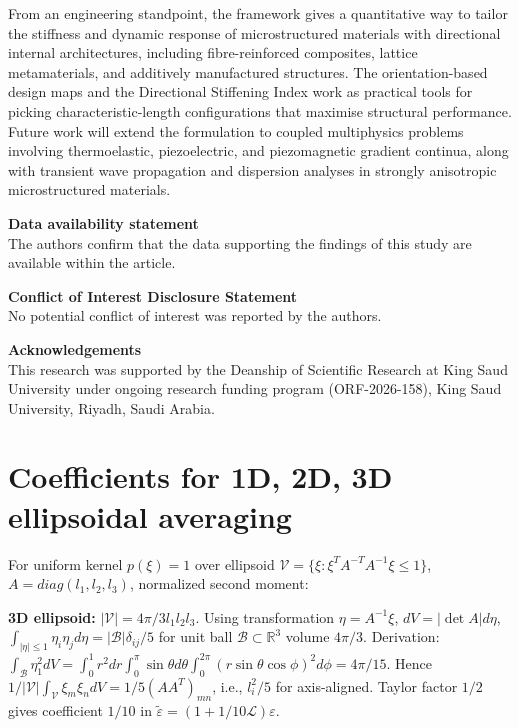 \documentclass[final,3p,times,fleqn]{elsarticle}
\newcommand{\rev}[1]{\textcolor{revcolor}{#1}}
\begin{document}
From an engineering standpoint, the framework gives a quantitative way
to tailor the stiffness and dynamic response of microstructured
materials with directional internal architectures, including
fibre-reinforced composites, lattice metamaterials, and additively
manufactured structures. The orientation-based design maps and the
Directional Stiffening Index work as practical tools for picking
characteristic-length configurations that maximise structural
performance. Future work will extend the formulation to coupled
multiphysics problems involving thermoelastic, piezoelectric, and
piezomagnetic gradient continua, along with transient wave propagation
and dispersion analyses in strongly anisotropic microstructured
materials.

\vspace{.4cm}
\noindent\textbf{\large{Data availability statement}}\\
The authors confirm that the data supporting the findings of this study
are available within the article.
\vspace{.4cm}

\noindent\textbf{\large{Conflict of Interest Disclosure Statement}}\\
No potential conflict of interest was reported by the authors.
\vspace{.4cm}

\noindent\textbf{\large{Acknowledgements}}\\
This research was supported by the Deanship of Scientific Research at King Saud University under ongoing research funding program (ORF-2026-158), King Saud University, Riyadh, Saudi Arabia.


\appendix
\section{Coefficients for 1D, 2D, 3D ellipsoidal averaging}
\label{app:coeffs}
\rev{For uniform kernel $p(\xi)=1$ over ellipsoid $\mathcal{V}=\{\xi: \xi^T A^{-T}A^{-1}\xi\le1\}$, $A=diag(l_1,l_2,l_3)$, normalized second moment:}

\rev{\textbf{3D ellipsoid:} $|\mathcal{V}|=4\pi/3 l_1l_2l_3$. Using transformation $\eta=A^{-1}\xi$, $dV=|\det A|d\eta$, $\int_{|\eta|\le1}\eta_i\eta_j d\eta = |\mathcal{B}|\delta_{ij}/5$ for unit ball $\mathcal{B}\subset\mathbb{R}^3$ volume $4\pi/3$. Derivation: $\int_{\mathcal{B}} \eta_1^2 dV = \int_0^1 r^2 dr \int_0^\pi \sin\theta d\theta \int_0^{2\pi} (r\sin\theta\cos\phi)^2 d\phi = 4\pi/15$. Hence $1/|\mathcal{V}|\int_{\mathcal{V}}\xi_m\xi_n dV = 1/5 (AA^T)_{mn}$, i.e., $l_i^2/5$ for axis-aligned. Taylor factor $1/2$ gives coefficient $1/10$ in $\tilde{\varepsilon}=(1+1/10\mathcal{L})\varepsilon$.}
\end{document}
